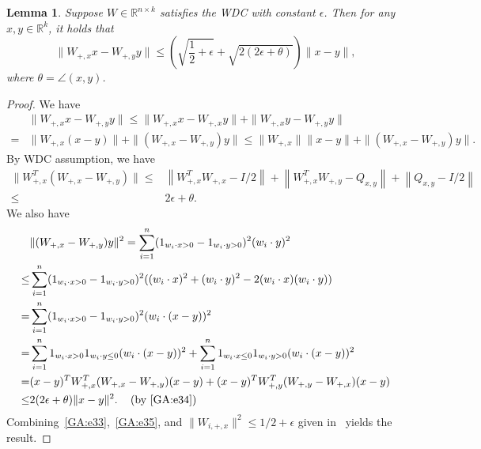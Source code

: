 \documentclass[11pt]{article}
\newtheorem{lemma}[theorem]{Lemma}
\begin{document}
\begin{lemma} \label{GA:le20}
Suppose $W \in \mathbb{R}^{n \times k}$ satisfies the WDC with constant $\epsilon$. Then for any $x, y \in \mathbb{R}^k$, it holds that
\begin{equation*}
\|W_{+, x} x - W_{+, y} y\| \leq \left( \sqrt{\frac{1}{2} + \epsilon} + \sqrt{2(2\epsilon + \theta)} \right) \|x - y\|,
\end{equation*}
where $\theta = \angle(x, y)$.
\end{lemma}
\begin{proof}
We have
\begin{align}
&\|W_{+, x} x - W_{+, y} y\| \leq \|W_{+, x} x - W_{+, x} y\| + \|W_{+, x} y - W_{+, y} y\| \nonumber \\
=& \|W_{+, x} (x - y)\| + \|(W_{+, x} - W_{+, y}) y\| \leq \|W_{+, x}\| \|x - y\| + \|(W_{+, x} - W_{+, y}) y\|. \label{GA:e33}
\end{align}
By WDC assumption, we have
\begin{align}
\|W_{+, x}^T (W_{+, x} - W_{+, y})\| \leq& \left\|W_{+, x}^T W_{+, x} - I  / 2\right\| + \left\|W_{+, x}^T W_{+, y} - Q_{x, y}\right\| + \left\| Q_{x, y} -  I / 2 \right\| \nonumber \\
\leq& 2 \epsilon + \theta. \label{GA:e34}
\end{align}
We also have
\begin{align}
&\|(W_{+, x} - W_{+, y}) y\|^2 = \sum_{i = 1}^n (1_{w_i \cdot x > 0} - 1_{w_i \cdot y > 0})^2 (w_i \cdot y)^2 \nonumber \\
\leq& \sum_{i = 1}^n (1_{w_i \cdot x > 0} - 1_{w_i \cdot y > 0})^2 ((w_i \cdot x)^2 + (w_i \cdot y)^2 - 2 (w_i \cdot x) (w_i \cdot y) ) \nonumber \\
=& \sum_{i = 1}^n (1_{w_i \cdot x > 0} - 1_{w_i \cdot y > 0})^2 (w_i \cdot (x - y) )^2 \nonumber \\
=& \sum_{i = 1}^n 1_{w_i \cdot x > 0} 1_{w_i \cdot y \leq 0} (w_i \cdot (x - y))^2 + \sum_{i = 1}^n 1_{w_i \cdot x \leq 0} 1_{w_i \cdot y > 0} (w_i \cdot(x - y))^2 \nonumber \\
=& (x - y)^T W_{+, x}^T (W_{+, x} - W_{+, y}) (x - y) + (x - y)^T W_{+, y}^T (W_{+, y} - W_{+, x}) (x - y) \nonumber \\
\leq& 2 (2 \epsilon + \theta) \|x - y\|^2. \;\;\; \hbox{ (by~\eqref{GA:e34})} \label{GA:e35}
\end{align}
Combining~\eqref{GA:e33},~\eqref{GA:e35}, and $\|W_{i, +, x}\|^2 \leq 1/2 + \epsilon$ given in~\cite[(10)]{hand_global_2017} yields the result.
\end{proof}
\end{document}
